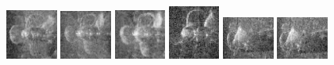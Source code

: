\begin{figure}
    \includegraphics[width=0.15\textwidth]{chapters/images/dataset/all-class-images/propeler/propeler-16.jpg}
    \includegraphics[width=0.15\textwidth]{chapters/images/dataset/all-class-images/propeler/propeler-93.jpg}
    \includegraphics[width=0.15\textwidth]{chapters/images/dataset/all-class-images/propeler/propeler-39.jpg}
    \includegraphics[width=0.15\textwidth]{chapters/images/dataset/all-class-images/propeler/propeler-71.jpg}
    \includegraphics[width=0.15\textwidth]{chapters/images/dataset/all-class-images/propeler/propeler-112.jpg}
    \includegraphics[width=0.15\textwidth]{chapters/images/dataset/all-class-images/propeler/propeler-111.jpg}
    

\end{figure}
